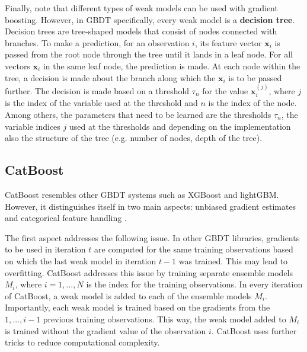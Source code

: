 \documentclass{article}
\begin{document}
	Finally, note that different types of weak models can be used with gradient boosting. However, in GBDT specifically, every weak model is a \textbf{decision tree}. Decision trees are tree-shaped models that consist of nodes connected with branches. To make a prediction, for an observation $i$, its feature vector $\textbf{x}_i$ is passed from the root node through the tree until it lands in a leaf node. For all vectors $\textbf{x}_i$ in the same leaf node, the prediction is made. At each node within the tree, a decision is made about the branch along which the $\textbf{x}_i$ is to be passed further. The decision is made based on a threshold $\tau_n$ for the value $\textbf{x}_{i}^{(j)}$, where $j$ is the index of the variable used at the threshold and $n$ is the index of the node. Among others, the parameters that need to be learned are the thresholds $\tau_n$, the variable indices $j$ used at the thresholds and depending on the implementation also the structure of the tree (e.g. number of nodes, depth of the tree).


	\subsection{CatBoost}
	
	CatBoost resembles other GBDT systems such as XGBoost and lightGBM. However, it distinguishes itself in two main aspects: unbiased gradient estimates and categorical feature handling \cite{dorogush_catboost:_2018}. 
	
	The first aspect addresses the following issue. In other GBDT libraries, gradients to be used in iteration $t$ are computed for the same training observations based on which the last weak model in iteration $t-1$ was trained. This may lead to overfitting. CatBoost addresses this issue by training separate ensemble models $M_i$, where $i = 1, ..., N$ is the index for the training observations. In every iteration of CatBoost, a weak model is added to each of the ensemble models $M_i$. Importantly, each weak model is trained based on the gradients from the $1, ..., i-1$ previous training observations. This way, the weak model added to $M_i$ is trained without the gradient value of the observation $i$. CatBoost uses further tricks to reduce computational complexity.
	
\end{document}
